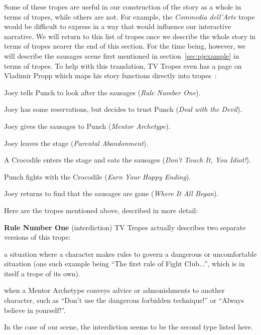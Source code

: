 Some of these tropes are useful in our construction of the story as a whole in
terms of tropes, while others are not. For example, the \emph{Commedia
  dell'Arte} trope would be difficult to express in a way that would influence
our interactive narrative. We will return to this list of tropes once we
describe the whole story in terms of tropes nearer the end of this section. For
the time being, however, we will describe the sausages scene first mentioned in
section~\ref{sec:pjexample} in terms of tropes. To help with this translation,
TV Tropes even has a page on Vladimir Propp which maps his story functions
directly into tropes~\cite{propp-tropes}:

\begin{compactenum}
  \item Joey tells Punch to look after the sausages (\emph{Rule Number One}).
  \item Joey has some reservations, but decides to trust Punch (\emph{Deal with
      the Devil}).
  \item Joey gives the sausages to Punch (\emph{Mentor Archetype}).
  \item Joey leaves the stage (\emph{Parental Abandonment}).
  \item A Crocodile enters the stage and eats the sausages (\emph{Don't Touch
      It, You Idiot!}).
  \item Punch fights with the Crocodile (\emph{Earn Your Happy Ending}).
  \item Joey returns to find that the sausages are gone (\emph{Where It All Began}).
\end{compactenum}

Here are the tropes mentioned above, described in more detail:

\textbf{Rule Number One} (interdiction)
TV Tropes actually describes two separate versions of this trope:

\begin{compactitem}
  \item a situation where a character makes rules to govern a dangerous or
    uncomfortable situation (one such example being ``The first rule of Fight
    Club...'', which is in itself a trope of its own).
  \item when a Mentor Archetype conveys advice or admonishments to another
    character, such as ``Don't use the dangerous forbidden technique!'' or
    ``Always believe in yourself!''.
\end{compactitem}

In the case of our scene, the interdiction seems to be the second type listed
here.

